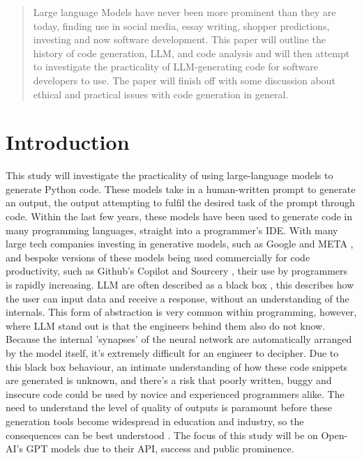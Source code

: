 \documentclass[manuscript,screen,review,sigconf]{acmart}
\begin{document}
\begin{abstract}
    Large language Models have never been more prominent than they are today, finding use in social media, essay writing, shopper predictions, investing and now software development. This paper will outline the history of code generation, LLM, and code analysis and will then attempt to investigate the practicality of LLM-generating code for software developers to use. The paper will finish off with some discussion about ethical and practical issues with code generation in general.
\end{abstract}

\maketitle


\section{Introduction}
This study will investigate the practicality of using large-language models to generate Python code. These models take in a human-written prompt to generate an output, the output attempting to fulfil the desired task of the prompt through code. Within the last few years, these models have been used to generate code in many programming languages, straight into a programmer's IDE. With many large tech companies investing in generative models, such as Google and META \cite{Google_AI_2023, Meta_2023}, and bespoke versions of these models being used commercially for code productivity, such as Github's Copilot and Sourcery \cite{GitHub_2021, Sourcery_2023}, their use by programmers is rapidly increasing. %
LLM are often described as a black box \cite{blackBoxNature}, this describes how the user can input data and receive a response, without an understanding of the internals. This form of abstraction is very common within programming, however, where LLM stand out is that the engineers behind them also do not know. Because the internal 'synapses' of the neural network are automatically arranged by the model itself, it's extremely difficult for an engineer to decipher.
Due to this black box behaviour, an intimate understanding of how these code snippets are generated is unknown, and there's a risk that poorly written, buggy and insecure code could be used by novice and experienced programmers alike. The need to understand the level of quality of outputs is paramount before these generation tools become widespread in education and industry, so the consequences can be best understood \cite{xai}. The focus of this study will be on Open-AI's GPT models due to their API, success and public prominence.
\end{document}
